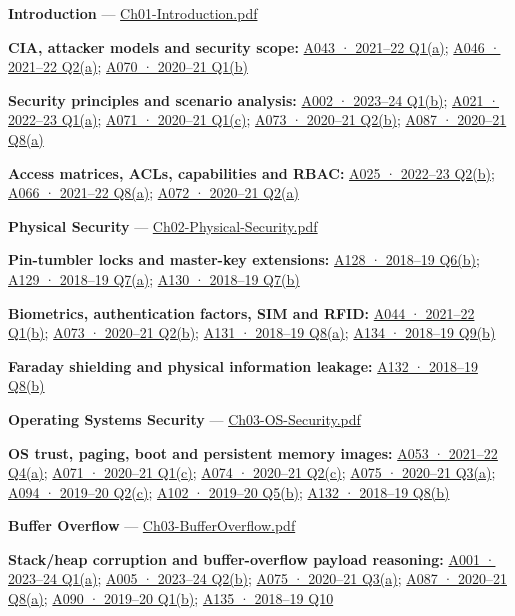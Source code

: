 \documentclass[11pt,a4paper]{article}
\begin{document}
\textbf{Introduction} — \href{../slides/Ch01-Introduction.pdf}{Ch01-Introduction.\allowbreak{}pdf}


\textbf{CIA,\allowbreak{} attacker models and security scope:} \hyperref[a043]{A043 · 2021–22 Q1(a)}; \hyperref[a046]{A046 · 2021–22 Q2(a)}; \hyperref[a070]{A070 · 2020–21 Q1(b)}


\textbf{Security principles and scenario analysis:} \hyperref[a002]{A002 · 2023–24 Q1(b)}; \hyperref[a021]{A021 · 2022–23 Q1(a)}; \hyperref[a071]{A071 · 2020–21 Q1(c)}; \hyperref[a073]{A073 · 2020–21 Q2(b)}; \hyperref[a087]{A087 · 2020–21 Q8(a)}


\textbf{Access matrices,\allowbreak{} ACLs,\allowbreak{} capabilities and RBAC:} \hyperref[a025]{A025 · 2022–23 Q2(b)}; \hyperref[a066]{A066 · 2021–22 Q8(a)}; \hyperref[a072]{A072 · 2020–21 Q2(a)}


\textbf{Physical Security} — \href{../slides/Ch02-Physical-Security.pdf}{Ch02-Physical-Security.\allowbreak{}pdf}


\textbf{Pin-tumbler locks and master-key extensions:} \hyperref[a128]{A128 · 2018–19 Q6(b)}; \hyperref[a129]{A129 · 2018–19 Q7(a)}; \hyperref[a130]{A130 · 2018–19 Q7(b)}


\textbf{Biometrics,\allowbreak{} authentication factors,\allowbreak{} SIM and RFID:} \hyperref[a044]{A044 · 2021–22 Q1(b)}; \hyperref[a073]{A073 · 2020–21 Q2(b)}; \hyperref[a131]{A131 · 2018–19 Q8(a)}; \hyperref[a134]{A134 · 2018–19 Q9(b)}


\textbf{Faraday shielding and physical information leakage:} \hyperref[a132]{A132 · 2018–19 Q8(b)}


\textbf{Operating Systems Security} — \href{../slides/Ch03-OS-Security.pdf}{Ch03-OS-Security.\allowbreak{}pdf}


\textbf{OS trust,\allowbreak{} paging,\allowbreak{} boot and persistent memory images:} \hyperref[a053]{A053 · 2021–22 Q4(a)}; \hyperref[a071]{A071 · 2020–21 Q1(c)}; \hyperref[a074]{A074 · 2020–21 Q2(c)}; \hyperref[a075]{A075 · 2020–21 Q3(a)}; \hyperref[a094]{A094 · 2019–20 Q2(c)}; \hyperref[a102]{A102 · 2019–20 Q5(b)}; \hyperref[a132]{A132 · 2018–19 Q8(b)}


\textbf{Buffer Overflow} — \href{../slides/Ch03-BufferOverflow.pdf}{Ch03-BufferOverflow.\allowbreak{}pdf}


\textbf{Stack/\allowbreak{}heap corruption and buffer-overflow payload reasoning:} \hyperref[a001]{A001 · 2023–24 Q1(a)}; \hyperref[a005]{A005 · 2023–24 Q2(b)}; \hyperref[a075]{A075 · 2020–21 Q3(a)}; \hyperref[a087]{A087 · 2020–21 Q8(a)}; \hyperref[a090]{A090 · 2019–20 Q1(b)}; \hyperref[a135]{A135 · 2018–19 Q10}
\end{document}
